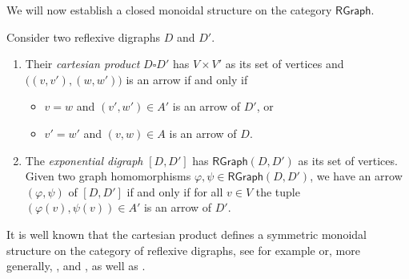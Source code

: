\documentclass[12pt,dvipsnames,oneside]{amsart}
\theoremstyle{plain}
\theoremstyle{remark}
\theoremstyle{definition}
\newcommand{\rgraph}{\mathsf{RGraph}}
\begin{document}
We will now establish a closed monoidal structure on the category \(\rgraph\).

\begin{definition}\label{def:cartesian-product-and-internal hom}
  Consider two reflexive digraphs \(D\) and \(D'\).
  \begin{enumerate}[label=(\arabic*),leftmargin=0.8cm]
    \item Their \emph{cartesian product} \(D \square D'\) has \(V \times V'\) as its set of vertices and \(\big((v,v'),(w,w')\big)\) is an arrow if and only if
    \begin{itemize}
      \item \(v=w\) and \((v',w')\in A'\) is an arrow of \(D'\), or
      \item \(v'= w'\) and \((v,w)\in A\) is an arrow of \(D\).
    \end{itemize}
    \item The \emph{exponential digraph} \([D, D']\) has \(\rgraph(D,D')\) as its set of vertices.  Given two graph homomorphisms \(\varphi, \psi \in \rgraph(D,D')\), we have an arrow \((\varphi, \psi)\) of \([D, D']\) if and only if for all \(v\in V\) the tuple \((\varphi(v), \psi(v))\in A'\) is an arrow of \(D'\). \qedhere
  \end{enumerate}
\end{definition}

It is well known that the cartesian product defines a symmetric monoidal structure on the category of reflexive digraphs, see for example \cite{ImrichPeterin} or, more generally, \cite[\S4.1]{HammackImrichKlavzar}, and \cite{BoikoCunoImrichLehnerWoestijne}, as well as \cite{Feigenbaum}.
\end{document}
